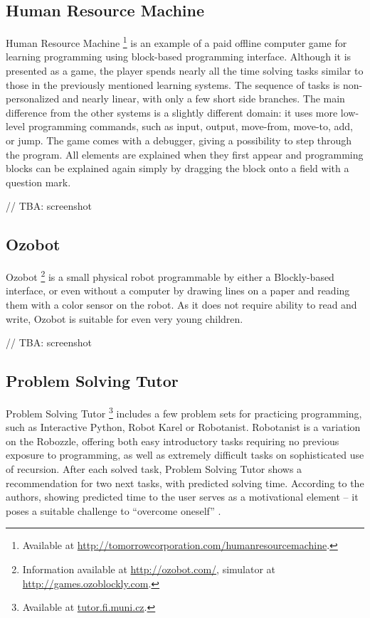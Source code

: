 \documentclass[
    digital,
    color,
    11pt,
    nocover,
    table,  %
    nolof,  %
    nolot,  %
    microtype,
]{fithesis3}
\begin{document}
\subsection{Human Resource Machine}
\label{sec:human-resource-machine}
Human Resource Machine%
\footnote{Available at \url{http://tomorrowcorporation.com/humanresourcemachine}.}
is an example of a paid offline computer game for learning programming using block-based programming interface.
Although it is presented as a game,
the player spends nearly all the time solving tasks similar to those in the previously mentioned learning systems.
The sequence of tasks is non-personalized and nearly linear,
with only a few short side branches.
The main difference from the other systems is a slightly different domain:
it uses more low-level programming commands, such as
input, output, move-from, move-to, add, or jump.
The game comes with a debugger, giving a possibility to step through the program.
All elements are explained when they first appear and programming blocks can be explained again simply by dragging the block onto a field with a question mark.

// TBA: screenshot


\subsection{Ozobot}
\label{sec:ozobot}
Ozobot%
\footnote{Information available at \url{http://ozobot.com/}, simulator at \url{http://games.ozoblockly.com}.}
is a small physical robot
programmable by either a Blockly-based interface,
  or even without a computer
  by drawing lines on a paper and reading them with a color sensor on the robot.
As it does not require ability to read and write,
  Ozobot is suitable for even very young children.

// TBA: screenshot


\subsection{Problem Solving Tutor}
\label{sec:problem-solving-tutor}
Problem Solving Tutor%
\footnote{Available at \url{tutor.fi.muni.cz}.}
includes a few problem sets for practicing programming,
such as Interactive Python, Robot Karel or Robotanist.
Robotanist is a variation on the Robozzle,
offering both easy introductory tasks requiring no previous exposure to programming,
as well as extremely difficult tasks on sophisticated use of recursion.
After each solved task, Problem Solving Tutor shows a recommendation for two next tasks,
with predicted solving time.
According to the authors, showing predicted time to the user serves as a motivational element
-- it poses a suitable challenge to ``overcome oneself''
\cite{pelanek-student-modeling-times}.
\end{document}
